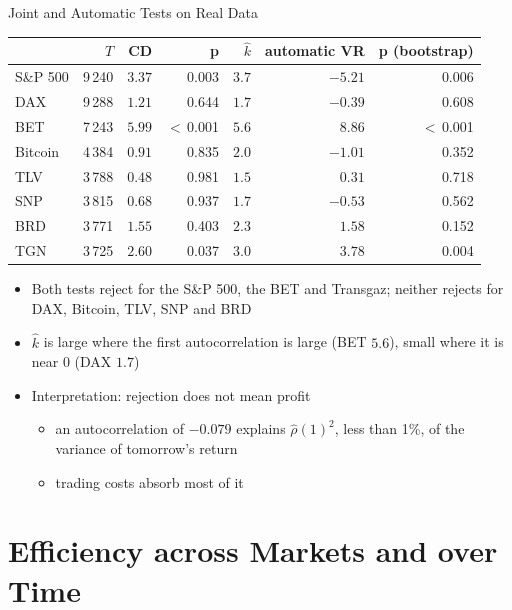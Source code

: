 \begin{frame}{Joint and Automatic Tests on Real Data}
\itemsize{\footnotesize}
\begin{center}
\scriptsize
\begin{tabular}{lrrrrrr}
\toprule
& $T$ & CD & p & $\hat k$ & automatic VR & p (bootstrap) \\
\midrule
S\&P 500 & 9\,240 & $3.37$ & 0.003 & $3.7$ & ${-5.21}$ & 0.006 \\
DAX & 9\,288 & $1.21$ & 0.644 & $1.7$ & ${-0.39}$ & 0.608 \\
BET & 7\,243 & $5.99$ & $<$\,0.001 & $5.6$ & ${8.86}$ & $<$\,0.001 \\
Bitcoin & 4\,384 & $0.91$ & 0.835 & $2.0$ & ${-1.01}$ & 0.352 \\
TLV & 3\,788 & $0.48$ & 0.981 & $1.5$ & ${0.31}$ & 0.718 \\
SNP & 3\,815 & $0.68$ & 0.937 & $1.7$ & ${-0.53}$ & 0.562 \\
BRD & 3\,771 & $1.55$ & 0.403 & $2.3$ & ${1.58}$ & 0.152 \\
TGN & 3\,725 & $2.60$ & 0.037 & $3.0$ & ${3.78}$ & 0.004 \\
\bottomrule
\end{tabular}
\end{center}
\begin{itemize}
    \item Both tests reject for the S\&P 500, the BET and Transgaz; neither rejects for DAX, Bitcoin, TLV, SNP and BRD
    \item $\hat k$ is large where the first autocorrelation is large (BET $5.6$), small where it is near 0 (DAX $1.7$)
    \item Interpretation: rejection does not mean profit
    \begin{itemize}
        \item an autocorrelation of $-0.079$ explains $\hat\rho(1)^2$, less than 1\%, of the variance of tomorrow's return
        \item trading costs absorb most of it
    \end{itemize}
\end{itemize}
\end{frame}


\section{Efficiency across Markets and over Time}

